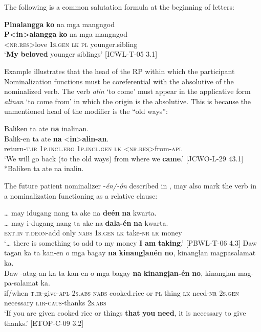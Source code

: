 The following is a common salutation formula at the beginning of letters:

\ea
\textbf{Pinalangga}  \textbf{ko}  na  mga  mangngod \smallskip\\
\gll \textbf{P<in>alangga}  \textbf{ko}  na  mga  mangngod \\
<\textsc{nr.res}>love  1\textsc{s.gen}  \textsc{lk}  \textsc{pl}  younger.sibling \\
\glt ‘\textbf{My} \textbf{beloved} younger siblings’ [ICWL-T-05 3.1]
\z

Example  illustrates that the head of the RP within which the participant Nominalization functions must be coreferential with the absolutive of the nominalized verb. The verb \textit{alin} ‘to come’ must appear in the applicative form \textit{alinan} ‘to come from’ in which the origin is the absolutive. This is because the unmentioned head of the modifier is the “old ways”:

\ea
\label{bkm:Ref474761456}
Baliken  ta  ate  \textbf{na}  inalinan. \smallskip\\
\gll Balik-en  ta  ate  \textbf{na}  <\textbf{in}>\textbf{alin-an}. \\
return-\textsc{t.ir}  1\textsc{p.incl.erg}  1\textsc{p.incl.gen}  \textsc{lk}  \textsc{<nr.res>}from-\textsc{apl} \\
\glt ‘We will go back (to the old ways) from where we \textbf{came}.’ [JCWO-L-29 43.1] \smallskip\\
*Baliken ta ate na inalin.
\z

The future patient nominalizer -\textit{én/-ón} described in ,  may also mark the verb in a nominalization functioning as a relative clause:

\ea
\label{bkm:Ref360193876}
… may  idugang  nang  ta  ake  na  \textbf{deén}  \textbf{na}  kwarta. \smallskip\\
\gll … may  i-dugang  nang  ta  ake  na  \textbf{dala-én}  \textbf{na}  kwarta. \\
{} \textsc{ext.in}  \textsc{t.deon}-add  only  \textsc{nabs}  1\textsc{s.gen}  \textsc{lk}  take-\textsc{nr}  \textsc{lk}  money \\
\glt ‘… there is something to add to my money \textbf{I} \textbf{am} \textbf{taking}.’ [PBWL-T-06 4.3]
\z
\ea
Daw  tagan  ka  ta  kan-en  o  mga  bagay  \textbf{na}  \textbf{kinangļanén}  \textbf{no}, kinangļan  magpasalamat  ka. \smallskip\\
\gll Daw  \emptyset{}-atag-an  ka  ta  kan-en  o  mga  bagay  \textbf{na}  \textbf{kinangļan-én}  \textbf{no}, kinangļan  mag-pa-salamat  ka. \\
if/when  \textsc{t.ir}-give-\textsc{apl}  2\textsc{s.abs}  \textsc{nabs}  cooked.rice  or  \textsc{pl}  thing  \textsc{lk}  need-\textsc{nr}  2\textsc{s.gen}
necessary  \textsc{i.ir}-\textsc{caus}-thanks  2\textsc{s.abs} \\
\glt `If you are given cooked rice or things \textbf{that} \textbf{you} \textbf{need}, it is necessary to give thanks.’ [ETOP-C-09 3.2]
\z

